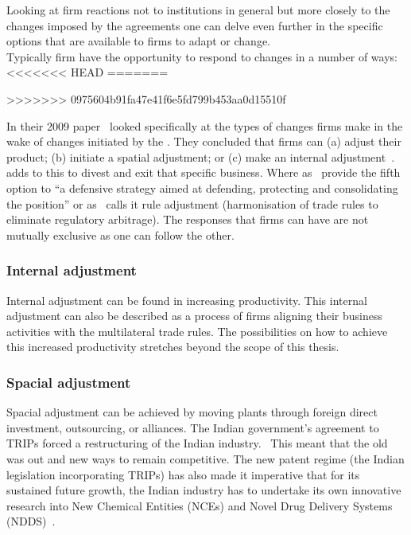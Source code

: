 Looking at firm reactions not to institutions in general but more closely to the changes imposed by the \wto agreements one can delve even further in the specific options that are available to firms to adapt or change.\\

Typically firm have the opportunity to respond to changes in a number of ways:\\
\noindent
<<<<<<< HEAD
=======

>>>>>>> 0975604b91fa47e41f6e5fd799b453aa0d15510f



In their 2009 paper~\cite{Lawton:2009vw} looked specifically at the types of changes firms make in the wake of changes initiated by the \wto. 
They concluded that firms can (a) adjust their product; (b) initiate a spatial adjustment; or (c) make an internal adjustment~\cite{Lawton:2009vw,Lawton:2005wo}.
~\cite{Chittoor:2008cj} adds to this to divest and exit that specific business.
Where as~\cite{Chittoor:2008cj} provide the fifth option to ``a defensive strategy aimed at defending, protecting and consolidating the position'' or as~\cite{Lawton:2005wo} calls it rule adjustment (harmonisation of trade rules to eliminate regulatory arbitrage).
The responses that firms can have are not mutually exclusive as one can follow the other.~\cite{Chittoor:2008cj,Lawton:2009vw}\\

\subsubsection{Internal adjustment}
Internal adjustment can be found in increasing productivity. 
This internal adjustment can also be described as a process of firms aligning their business activities with the multilateral trade rules.\cite{Lawton:2009vw}
The possibilities on how to achieve this increased productivity stretches beyond the scope of this thesis.
\subsubsection{Spacial adjustment}
Spacial adjustment can be achieved by moving plants through foreign direct investment, outsourcing, or alliances. 
The Indian government’s agreement to TRIPs forced a restructuring of the Indian industry.~\cite{Lawton:2009vw} 
This meant that the old was out and new ways to remain competitive.
The new patent regime (the Indian legislation incorporating TRIPs) has also made it imperative that for its sustained future growth, the Indian \pharma industry has to undertake its own innovative research into New Chemical Entities (NCEs) and Novel Drug Delivery Systems (NDDS)~\cite{Lawton:2009vw}. \\
